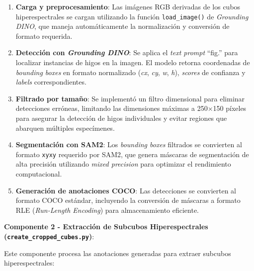 \begin{enumerate}
\item \textbf{Carga y preprocesamiento}: Las imágenes RGB derivadas de los cubos hiperespectrales se cargan utilizando la función \texttt{load\_image()} de \emph{Grounding DINO}, que maneja automáticamente la normalización y conversión de formato requerida.

\item \textbf{Detección con \emph{Grounding DINO}}: Se aplica el \emph{text prompt} ``fig.'' para localizar instancias de higos en la imagen. El modelo retorna coordenadas de \emph{bounding boxes} en formato normalizado (\emph{cx}, \emph{cy}, \emph{w}, \emph{h}), \emph{scores} de confianza y \emph{labels} correspondientes.

\item \textbf{Filtrado por tamaño}: Se implementó un filtro dimensional para eliminar detecciones erróneas, limitando las dimensiones máximas a 250×150 píxeles para asegurar la detección de higos individuales y evitar regiones que abarquen múltiples especímenes.

\item \textbf{Segmentación con SAM2}: Los \emph{bounding boxes} filtrados se convierten al formato \texttt{xyxy} requerido por SAM2, que genera máscaras de segmentación de alta precisión utilizando \emph{mixed precision} para optimizar el rendimiento computacional.

\item \textbf{Generación de anotaciones COCO}: Las detecciones se convierten al formato COCO estándar, incluyendo la conversión de máscaras a formato RLE (\emph{Run-Length Encoding}) para almacenamiento eficiente.
\end{enumerate}


\textbf{Componente 2 - Extracción de Subcubos Hiperespectrales (\texttt{create\_cropped\_cubes.py})}:

Este componente procesa las anotaciones generadas para extraer subcubos hiperespectrales:


